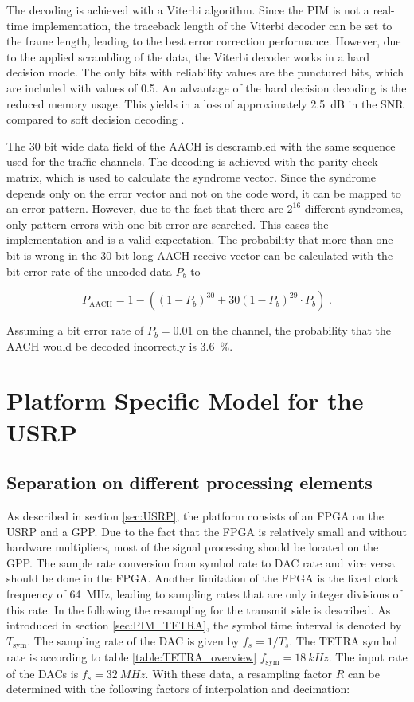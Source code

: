 The decoding is achieved with a Viterbi algorithm. Since the \ac{PIM} is not a real-time implementation, the traceback length of the Viterbi decoder can be set to the frame length, leading to the best error correction performance. However, due to the applied scrambling of the data, the Viterbi decoder works in a hard decision mode. The only bits with reliability values are the punctured bits, which are included with values of 0.5. An advantage of the hard decision decoding is the reduced memory usage. This yields in a loss of approximately \SI{2.5}{dB} in the SNR compared to soft decision decoding \cite{Bossert}.

The 30 bit wide data field of the \ac{AACH} is descrambled with the same sequence used for the traffic channels. The decoding is achieved with the parity check matrix, which is used to calculate the syndrome vector. Since the syndrome depends only on the error vector and not on the code word, it can be mapped to an error pattern. However, due to the fact that there are $2^{16}$ different syndromes, only pattern errors with one bit error are searched. This eases the implementation and is a valid expectation. The probability that more than one bit is wrong in the 30 bit long \ac{AACH} receive vector can be calculated with the bit error rate of the uncoded data $P_b$ to

\begin{equation}
P_\text{AACH} = 1-\left(\left(1-P_b\right)^{30}+30\left(1-P_b\right)^{29} \cdot P_b\right)\;.
\end{equation}

Assuming a bit error rate of $P_b = 0.01$ on the channel, the probability that the AACH would be decoded incorrectly is \SI{3.6}{\%}.


\section{Platform Specific Model for the USRP}
\label{sec:PSM_USRP}

\subsection{Separation on different processing elements}
As described in section \ref{sec:USRP}, the platform consists of an FPGA on the USRP and a GPP. Due to the fact that the FPGA is relatively small and without hardware multipliers, most of the signal processing should be located on the GPP. The sample rate conversion from symbol rate to \ac{DAC} rate and vice versa should be done in the FPGA. Another limitation of the FPGA is the fixed clock frequency of \SI{64}{MHz}, leading to sampling rates that are only integer divisions of this rate. In the following the resampling for the transmit side is described. As introduced in section \ref{sec:PIM_TETRA}, the symbol time interval is denoted by $T_\text{sym}$. The sampling rate of the \ac{DAC} is given by $f_s = 1/T_s$. The TETRA symbol rate is according to table \ref{table:TETRA_overview} $f_\text{sym} = \SI{18}{kHz}$. The input rate of the \acp{DAC} is $f_s = \SI{32}{MHz}$. With these data, a resampling factor $R$ can be determined with the following factors of interpolation and decimation:

